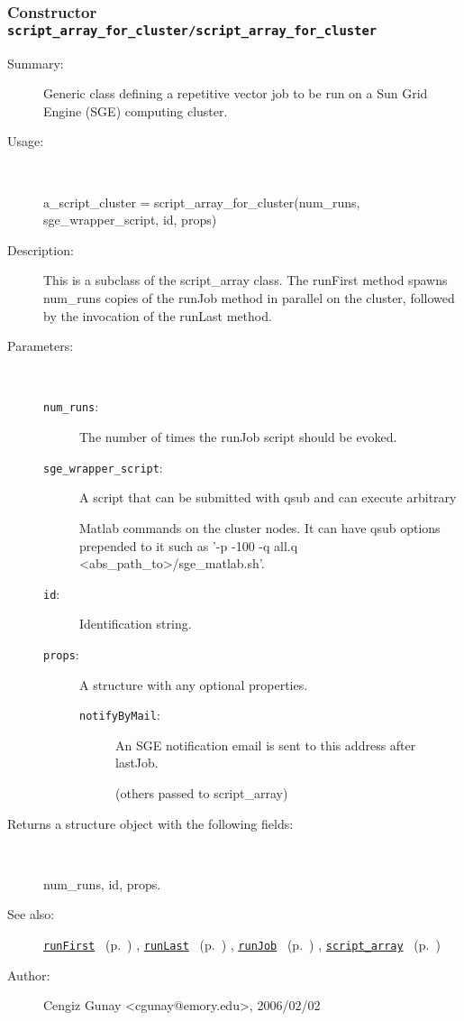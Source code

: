 \subsubsection[Constructor \texttt{script\_array\_for\_cluster}]{Constructor \texttt{script\_array\_for\_cluster/script\_array\_for\_cluster}}%
%
\label{ref_script_array_for_cluster__script_array_for_cluster}%
\hypertarget{ref_script_array_for_cluster__script_array_for_cluster}{}%
\begin{description}
\item[Summary:]Generic class defining a repetitive vector job to be run on a Sun Grid Engine (SGE) computing cluster.
%
\item[Usage:]~%
\begin{lyxcode}%
a\_script\_cluster = script\_array\_for\_cluster(num\_runs, sge\_wrapper\_script, id, props)
%
\end{lyxcode}%
%
\item[Description:]%
This is a subclass of the script\_array class. The runFirst method spawns num\_runs
 copies of the runJob method in parallel on the cluster, followed by the invocation 
 of the runLast method.
\item[Parameters:]~
\begin{description}%
\item[\texttt{num\_runs}:]
 The number of times the runJob script should be evoked.
\item[\texttt{sge\_wrapper\_script}:]
 A script that can be submitted with qsub and can execute arbitrary

Matlab commands on the cluster nodes. It can have qsub options prepended to it
such as '-p -100 -q all.q <abs\_path\_to>/sge\_matlab.sh'.
\item[\texttt{id}:]
 Identification string.
\item[\texttt{props}:]
 A structure with any optional properties.
\begin{description}%
\item[\texttt{notifyByMail}:]
 An SGE notification email is sent to this address after lastJob.

(others passed to script\_array)
\end{description}%
\end{description}%
%
\item[Returns a structure object with the following fields:
]~

	num\_runs, id, props.
%
%
\item[See also:]%
\hyperlink{ref_runFirst}{\texttt{runFirst}}%
\ (p.~\pageref{ref_runFirst})%
%
, \hyperlink{ref_runLast}{\texttt{runLast}}%
\ (p.~\pageref{ref_runLast})%
%
, \hyperlink{ref_runJob}{\texttt{runJob}}%
\ (p.~\pageref{ref_runJob})%
%
, \hyperlink{ref_script_array}{\texttt{script\_array}}%
\ (p.~\pageref{ref_script_array})%
%
%
\item[Author:]%
Cengiz Gunay <cgunay@emory.edu>, 2006/02/02
%
\end{description}
\methodline%
